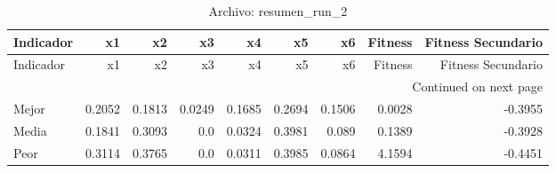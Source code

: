 \begin{longtable}{lrrrrrrrr}
\caption{Archivo: resumen\_run\_2}\label{tab:resumen_run_2} \\
\toprule
Indicador & x1 & x2 & x3 & x4 & x5 & x6 & Fitness & Fitness Secundario \\
\midrule
\endfirsthead
\toprule
Indicador & x1 & x2 & x3 & x4 & x5 & x6 & Fitness & Fitness Secundario \\
\midrule
\endhead
\midrule
\multicolumn{9}{r}{Continued on next page} \\
\midrule
\endfoot
\bottomrule
\endlastfoot
Mejor & 0.2052 & 0.1813 & 0.0249 & 0.1685 & 0.2694 & 0.1506 & 0.0028 & -0.3955 \\
Media & 0.1841 & 0.3093 & 0.0 & 0.0324 & 0.3981 & 0.089 & 0.1389 & -0.3928 \\
Peor & 0.3114 & 0.3765 & 0.0 & 0.0311 & 0.3985 & 0.0864 & 4.1594 & -0.4451 \\
\end{longtable}